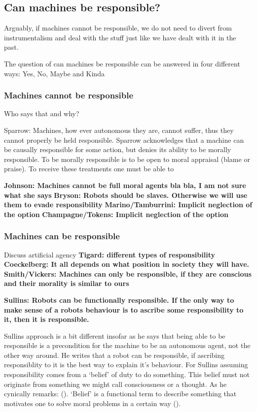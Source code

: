 \documentclass{article}
\begin{document}
\subsection{Can machines be responsible?}
Arguably, if machines cannot be responsible, we do not need to divert from
instrumentalism and deal with the stuff just like we have dealt with it in the
past.

The question of can machines be responsible can be answered in four different
ways: Yes, No, Maybe and Kinda

\subsubsection{Machines cannot be responsible}
Who says that and why?

Sparrow: Machines, how ever autonomous they are, cannot suffer, thus they cannot
properly be held responsible.
Sparrow acknowledges that a machine can be causally responsible for some action,
but denies its ability to be morally responsible. To be morally responsible is to be
open to moral appraisal (blame or praise). To receive these treatments one must
be able to 


\textbf{Johnson: Machines cannot be full moral agents bla bla, I am not sure what she
says}
\textbf{Bryson: Robots should be slaves. Otherwise we will use them to evade
responsibility}
\textbf{Marino/Tamburrini: Implicit neglection of the option}
\textbf{Champagne/Tokens: Implicit neglection of the option}

\subsubsection{Machines can be responsible}
Discuss artificial agency
\textbf{Tigard: different types of responsibility}
\textbf{Coeckelberg: It all depends on what position in society they will have.}
\textbf{Smith/Vickers: Machines can only be responsible, if they are conscious and their
morality is similar to ours}

\textbf{Sullins: Robots can be functionally responsible. If the only way to make sense
of a robots behaviour is to ascribe some responsibility to it, then it is
responsible.}

Sullins approach is a bit different insofar as he says that being able to be
responsible is a precondition for the machine to be an autonomous agent, not the
other way around. He writes that a robot can be responsible, if ascribing responsiblity to it
is the best way to explain it's behaviour. For Sullins assuming responsibility
comes from a `belief' of duty to do something. This belief must not originate
from something we might call consciousness or a thought. As he cynically
remarks: (\cite[p. 159]{sullins2006robots}).
`Belief' is a functional term
to describe something that motivates one to solve moral problems in a certain
way (\cite[p. 159]{sullins2006robots}).
\end{document}
